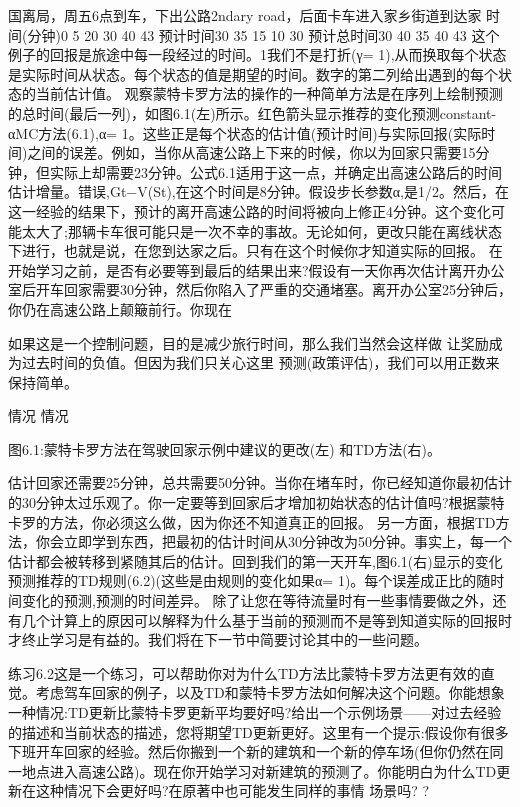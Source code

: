 国离局，周五6点到车，下出公路2ndary road，后面卡车进入家乡街道到达家	时间(分钟)0 5 20 30 40 43	预计时间30 35 15 10 30	预计总时间30 40 35 40 43
这个例子的回报是旅途中每一段经过的时间。1我们不是打折(γ= 1),从而换取每个状态是实际时间从状态。每个状态的值是期望的时间。数字的第二列给出遇到的每个状态的当前估计值。
观察蒙特卡罗方法的操作的一种简单方法是在序列上绘制预测的总时间(最后一列)，如图6.1(左)所示。红色箭头显示推荐的变化预测constant-αMC方法(6.1),α= 1。这些正是每个状态的估计值(预计时间)与实际回报(实际时间)之间的误差。例如，当你从高速公路上下来的时候，你以为回家只需要15分钟，但实际上却需要23分钟。公式6.1适用于这一点，并确定出高速公路后的时间估计增量。错误,Gt−V(St),在这个时间是8分钟。假设步长参数α,是1/2。然后，在这一经验的结果下，预计的离开高速公路的时间将被向上修正4分钟。这个变化可能太大了;那辆卡车很可能只是一次不幸的事故。无论如何，更改只能在离线状态下进行，也就是说，在您到达家之后。只有在这个时候你才知道实际的回报。
在开始学习之前，是否有必要等到最后的结果出来?假设有一天你再次估计离开办公室后开车回家需要30分钟，然后你陷入了严重的交通堵塞。离开办公室25分钟后，你仍在高速公路上颠簸前行。你现在

如果这是一个控制问题，目的是减少旅行时间，那么我们当然会这样做
让奖励成为过去时间的负值。但因为我们只关心这里
预测(政策评估)，我们可以用正数来保持简单。

情况 					情况


图6.1:蒙特卡罗方法在驾驶回家示例中建议的更改(左)
和TD方法(右)。



估计回家还需要25分钟，总共需要50分钟。当你在堵车时，你已经知道你最初估计的30分钟太过乐观了。你一定要等到回家后才增加初始状态的估计值吗?根据蒙特卡罗的方法，你必须这么做，因为你还不知道真正的回报。
另一方面，根据TD方法，你会立即学到东西，把最初的估计时间从30分钟改为50分钟。事实上，每一个估计都会被转移到紧随其后的估计。回到我们的第一天开车,图6.1(右)显示的变化预测推荐的TD规则(6.2)(这些是由规则的变化如果α= 1)。每个误差成正比的随时间变化的预测,预测的时间差异。
除了让您在等待流量时有一些事情要做之外，还有几个计算上的原因可以解释为什么基于当前的预测而不是等到知道实际的回报时才终止学习是有益的。我们将在下一节中简要讨论其中的一些问题。

练习6.2这是一个练习，可以帮助你对为什么TD方法比蒙特卡罗方法更有效的直觉。考虑驾车回家的例子，以及TD和蒙特卡罗方法如何解决这个问题。你能想象一种情况:TD更新比蒙特卡罗更新平均要好吗?给出一个示例场景——对过去经验的描述和当前状态的描述，您将期望TD更新更好。这里有一个提示:假设你有很多下班开车回家的经验。然后你搬到一个新的建筑和一个新的停车场(但你仍然在同一地点进入高速公路)。现在你开始学习对新建筑的预测了。你能明白为什么TD更新在这种情况下会更好吗?在原著中也可能发生同样的事情
场景吗? 					?

